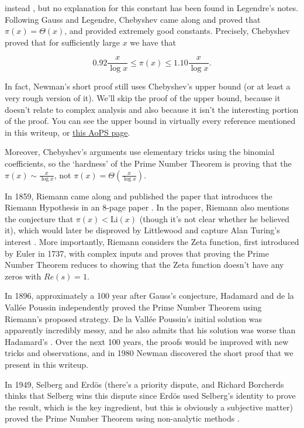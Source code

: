 \documentclass{article}
\theoremstyle{definition}
\begin{document}
instead \cite{bambah_centennial_2000}, but no explanation for this constant has been found in Legendre's notes.
Following Gauss and Legendre, Chebyshev came along and proved that $ \pi(x) = \Theta(x) $,
and provided extremely good constants. Precisely, Chebyshev \cite{bateman_hundred_1996} proved that for 
sufficiently large $ x $ we have that

\[ 0.92 \frac{x}{\log x} \leq \pi(x) \leq 1.10 \frac{x}{\log x}. \]

In fact, Newman's short proof \cite{zagier_newmans_1997} still uses Chebyshev's upper bound
(or at least a very rough version of it). We'll skip the proof of the upper bound, because
it doesn't relate to complex analysis and also because it isn't the interesting portion of the proof.
You can see the upper bound in virtually every reference mentioned in this writeup, or \href{https://artofproblemsolving.com/wiki/index.php/Chebyshev_theta_function#Estimates_of_the_function}
{this AoPS page}.

Moreover, Chebyshev's arguments use elementary tricks using the binomial coefficients,
so the `hardness' of the Prime Number Theorem is proving that the $ \pi(x) \sim \frac{x}{\log x} $,
not $ \pi(x) = \Theta(\frac{x}{\log x}) $.

In 1859, Riemann came along and published the paper that introduces the
Riemann Hypothesis in an 8-page paper \cite{wilkins_number_1998}. In the paper, Riemann also
mentions the conjecture that $ \pi(x) < \text{Li}(x) $ (though it's not clear whether he believed it), which would later
be disproved by Littlewood and capture Alan Turing's interest \cite{princetonacademics_andrew_2012} \cite{matiyasevich_riemann_2020} \cite{hejhal_alan_2012}. More importantly,
Riemann considers the Zeta function, first introduced by Euler in 1737, 
with complex inputs and proves that proving the Prime Number Theorem
reduces to showing that the Zeta function doesn't have any zeros with $ Re(s) = 1 $.

In 1896, approximately a 100 year after Gauss's conjecture, Hadamard and de la Vallée Poussin
independently proved the Prime Number Theorem using Riemann's proposed strategy. De la Vallée Poussin's
initial solution was apparently incredibly messy, and he also admits that his solution was worse than
Hadamard's \cite{bambah_centennial_2000}. Over the next 100 years, the proofs would be improved with new tricks and observations, 
and in 1980 Newman discovered the short proof that we present in this writeup.

In 1949, Selberg and Erdös (there's a priority dispute, and Richard Borcherds thinks
that Selberg wins this dispute since Erdös used Selberg's identity to prove the result, which is the
key ingredient, but this is obviously a subjective matter) proved the Prime Number Theorem using non-analytic methods \cite{bambah_centennial_2000} \cite{richard_e_borcherds_introduction_2022}.
\end{document}
